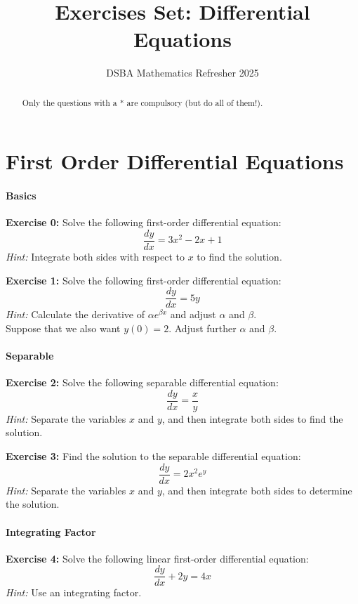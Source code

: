 \documentclass[]{article}
\title{Exercises Set: Differential Equations}
\author{DSBA Mathematics Refresher 2025}
\date{}
\begin{document}
	\maketitle
	
	\begin{abstract}
		Only the questions with a * are compulsory (but do all of them!).
	\end{abstract}	
	
	\section{First Order Differential Equations}
	\paragraph{Basics}\mbox{}
	
	\textbf{Exercise 0:}
	Solve the following first-order differential equation:
	$$
	\frac{dy}{dx} = 3x^2 - 2x + 1
	$$
	\textit{Hint:} Integrate both sides with respect to $x$ to find the solution.
	
	\textbf{Exercise 1:}
	Solve the following first-order differential equation:
	$$
	\frac{dy}{dx} = 5y
	$$
	\textit{Hint:} Calculate the derivative of $\alpha e^{\beta x}$ and adjust $\alpha$ and $\beta$.\\
	Suppose that we also want $y(0) = 2$. Adjust further $\alpha$ and $\beta$.
	
	
	\paragraph{Separable}\mbox{}
	
	\textbf{Exercise 2:}
	Solve the following separable differential equation:
	$$
	\frac{dy}{dx} = \frac{x}{y}
	$$
	\textit{Hint:} Separate the variables $x$ and $y$, and then integrate both sides to find the solution.
	
	\textbf{Exercise 3:}
	Find the solution to the separable differential equation:
	$$
	\frac{dy}{dx} = 2x^2 e^y
	$$
	\textit{Hint:} Separate the variables $x$ and $y$, and then integrate both sides to determine the solution.
	
	\paragraph{Integrating Factor}\mbox{}
	
	\textbf{Exercise 4:}
	Solve the following linear first-order differential equation:
	$$
	\frac{dy}{dx} + 2y = 4x
	$$
	\textit{Hint:} Use an integrating factor.
	
\end{document}
